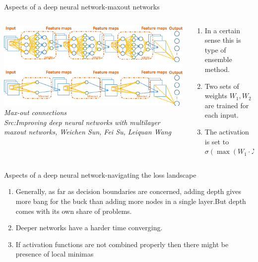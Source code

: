 \begin{frame}{Aspects of a deep neural network-maxout networks }
	\begin{columns}[T]
        \begin{column}{0.4\textwidth}
        	\includegraphics[width=\textwidth]{images/maxout.png}
			\tiny{\textit{Max-out connections\\ Src:Improving deep neural networks with multilayer maxout networks, Weichen Sun, Fei Su, Leiquan Wang}}
        \end{column}
	    \begin{column}{0.6\textwidth} 
			\begin{enumerate}[$\bullet$]
				\item In a certain sense this is type of ensemble method.\pause
				\item Two sets of weights $W_1,W_2$ are trained for each input.
				\item The activation is set to $\sigma\left(\max(W_1\cdot X_{in},W_2\cdot X_{in})+b_0\right)$
			\end{enumerate}
    	\end{column}
    \end{columns}
\end{frame}

\begin{frame}{Aspects of a deep neural network-navigating the loss landscape}
	\begin{enumerate}[$\bullet$]
		\item Generally, as far as decision boundaries are concerned, adding depth gives more bang for the buck than adding more nodes in a single layer.\pause But depth comes with its own share of problems.\pause
		\item Deeper networks have a harder time converging.\pause
		\item If activation functions are not combined properly then there might be presence of local minimas
	\end{enumerate}
\end{frame}

